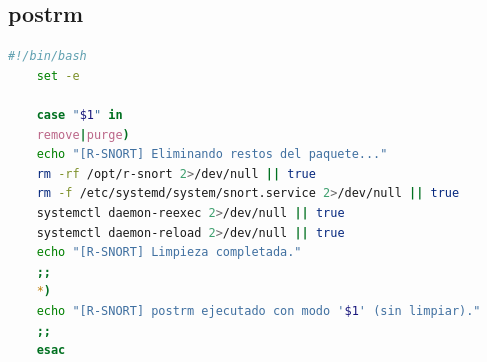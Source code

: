 \documentclass[11pt,a4paper,twoside]{report}
\begin{document}
\subsection*{postrm}
\begin{lstlisting}[language=bash, caption={Script postrm.}, label={lst:postrm}]
	#!/bin/bash
	set -e
	
	case "$1" in
	remove|purge)
	echo "[R-SNORT] Eliminando restos del paquete..."
	rm -rf /opt/r-snort 2>/dev/null || true
	rm -f /etc/systemd/system/snort.service 2>/dev/null || true
	systemctl daemon-reexec 2>/dev/null || true
	systemctl daemon-reload 2>/dev/null || true
	echo "[R-SNORT] Limpieza completada."
	;;
	*)
	echo "[R-SNORT] postrm ejecutado con modo '$1' (sin limpiar)."
	;;
	esac
\end{lstlisting}


\end{document}
